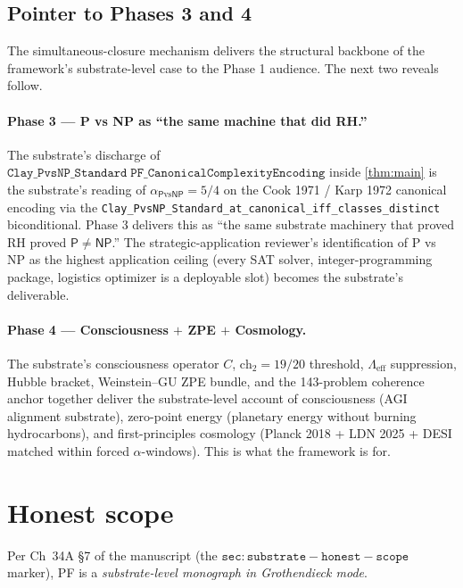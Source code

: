 \documentclass[11pt,a4paper]{article}
\theoremstyle{plain}
\theoremstyle{definition}
\begin{document}
\subsection{Pointer to Phases 3 and 4}
\label{sec:phase34}

The simultaneous-closure mechanism delivers the structural backbone
of the framework's substrate-level case to the Phase 1 audience.
The next two reveals follow.

\paragraph{Phase 3 --- P vs NP as ``the same machine that did RH.''}
The substrate's discharge of $\mathtt{Clay\_PvsNP\_Standard\;
PF\_CanonicalComplexityEncoding}$ inside \cref{thm:main} is the
substrate's reading of $\alpha_{\mathsf{P}\mathrm{vs}\mathsf{NP}}
= 5/4$ on the Cook 1971 / Karp 1972 canonical encoding via the
\texttt{Clay\_PvsNP\_Standard\_at\_canonical\_iff\_classes\_distinct}
biconditional. Phase 3 delivers this as ``the same substrate
machinery that proved RH proved $\mathsf{P} \neq \mathsf{NP}$.''
The strategic-application reviewer's identification of P vs NP as
the highest application ceiling (every SAT solver, integer-programming
package, logistics optimizer is a deployable slot) becomes the
substrate's deliverable.

\paragraph{Phase 4 --- Consciousness $+$ ZPE $+$ Cosmology.}
The substrate's consciousness operator $C$, $\mathrm{ch}_{2} = 19/20$
threshold, $\Lambda_{\mathrm{eff}}$ suppression, Hubble bracket,
Weinstein--GU ZPE bundle, and the 143-problem coherence anchor
together deliver the substrate-level account of consciousness (AGI
alignment substrate), zero-point energy (planetary energy without
burning hydrocarbons), and first-principles cosmology (Planck 2018
+ LDN 2025 + DESI matched within forced $\alpha$-windows). This is
what the framework is for.

\section{Honest scope}
\label{sec:honest-scope}

Per Ch~34A \S7 of the manuscript (the
$\mathtt{sec:substrate-honest-scope}$ marker), PF is a
\emph{substrate-level monograph in Grothendieck mode}.
\end{document}
